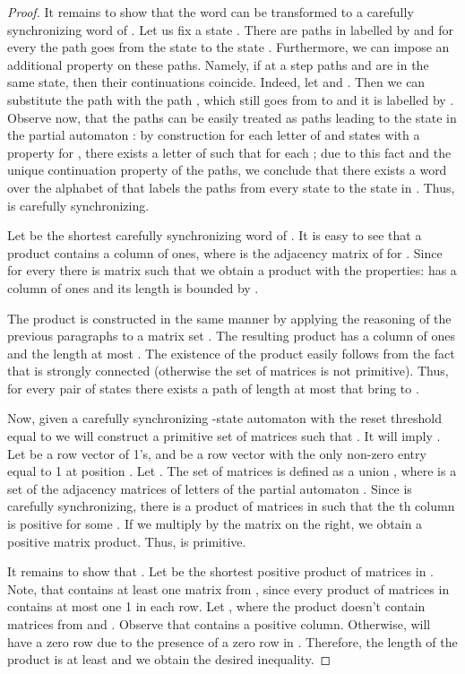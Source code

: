 \documentclass[a4paper,USenglish]{lipics}
\theoremstyle{definition}
\begin{document}
\begin{proof}
It remains to show that the word  can be transformed to a carefully synchronizing word of . Let us fix a state . There are paths  in  labelled by  and for every  the path  goes from the state  to the state . Furthermore, we can impose an additional property on these paths. Namely, if at a step  paths  and  are in the same state, then their continuations coincide. Indeed, let  and . Then we can substitute the path  with the path , which still goes from  to  and it is labelled by .
Observe now, that the paths  can be easily treated as paths leading to the state  in the partial automaton : by construction for each letter  of  and states  with a property  for , there exists a letter  of  such that  for each ; due to this fact and the unique continuation property of the paths, we conclude that there exists a word  over the alphabet of  that labels the paths from every state to the state  in . Thus,  is carefully synchronizing.


Let  be the shortest carefully synchronizing word of . It is easy to see that a product  contains a column of ones, where  is the adjacency matrix of  for . Since for every  there is matrix  such that  we obtain a product  with the properties:  has a column of ones and its length is bounded by .

The product  is constructed in the same manner by applying the reasoning of the previous paragraphs to a matrix set . The resulting product  has a column of ones and the length at most . The existence of the product  easily follows from the fact that  is strongly connected (otherwise the set of matrices  is not primitive). Thus, for every pair of states  there exists a path of length at most  that bring  to .


Now, given a carefully synchronizing -state automaton  with the reset threshold equal to  we will construct a primitive set of matrices  such that . It will imply .
Let  be a row vector of 1's, and  be a row vector with the only non-zero entry equal to 1 at position . Let . The set of matrices  is defined as a union , where  is a set of the adjacency matrices of letters of the partial automaton . Since  is carefully synchronizing, there is a product  of matrices in  such that the th column is positive for some . If we multiply  by the matrix  on the right, we obtain a positive matrix product. Thus,  is primitive.

It remains to show that .
Let  be the shortest positive product of matrices in . Note, that  contains at least one matrix from , since every product of matrices in  contains at most one 1 in each row. Let , where the product  doesn't contain matrices from  and . Observe that  contains a positive column. Otherwise,  will have a zero row due to the presence of a zero row in . Therefore, the length of the product  is at least  and we obtain the desired inequality.
\end{proof}
\end{document}
